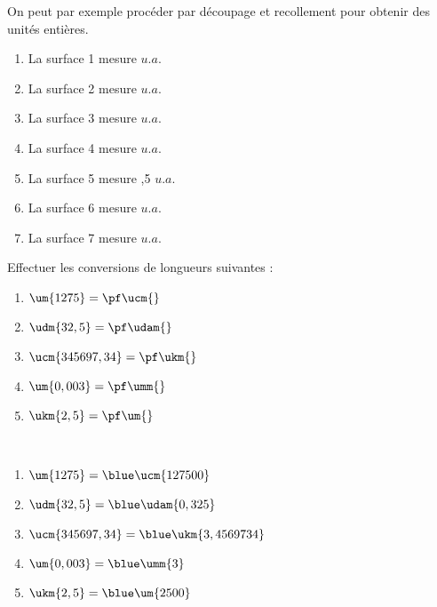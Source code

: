 \begin{colonne*exercice}
\begin{corrige}
   On peut par exemple procéder par découpage et recollement pour obtenir des unités entières. \\
   \begin{enumerate}
      \item La surface 1 mesure { $u.a.$}
      \item La surface 2 mesure  { $u.a.$}
      \item La surface 3 mesure { $u.a.$}
      \item La surface 4 mesure { $u.a.$}
      \item La surface 5 mesure {,5 $u.a.$}
      \item La surface 6 mesure { $u.a.$}
      \item La surface 7 mesure { $u.a.$}
   \end{enumerate}
\end{corrige}

\medskip


\medskip

\begin{exercice}
   Effectuer les conversions de longueurs suivantes :
   \begin{enumerate}
      \item $\um{1275} =\pf \ucm{}$
      \item $\udm{32,5} =\pf\udam{}$
      \item $\ucm{345697,34} =\pf\ukm{}$
      \item $\um{0,003} =\pf\umm{}$
      \item $\ukm{2,5} =\pf \um{}$
   \end{enumerate}
\end{exercice}

\begin{corrige}
   \ \\ [-5mm]
   \begin{enumerate}
      \item $\um{1275} =\blue\ucm{127500}$
      \item $\udm{32,5} =\blue\udam{0,325}$
      \item $\ucm{345697,34} =\blue\ukm{3,4569734}$
      \item $\um{0,003} =\blue\umm{3}$
      \item $\ukm{2,5} =\blue\um{2500}$
   \end{enumerate}
\end{corrige}


\end{colonne*exercice}
